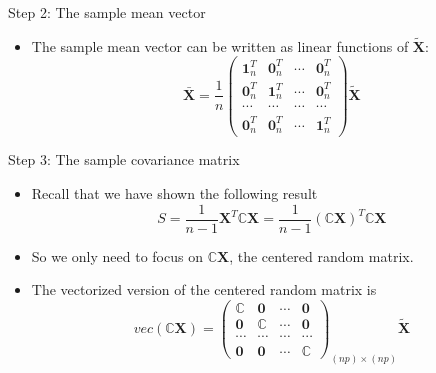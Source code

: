 \documentclass[
  ignorenonframetext,
]{beamer}
\providecommand{\tightlist}{%
  \setlength{\itemsep}{0pt}\setlength{\parskip}{0pt}}
\begin{document}
\begin{frame}{Step 2: The sample mean vector}
\protect\hypertarget{step-2-the-sample-mean-vector}{}
\begin{itemize}
\tightlist
\item
  The sample mean vector can be written as linear functions of
  \(\tilde {\mathbf X}\):
  \[\bar{\mathbf X}=\frac{1}{n} \begin{pmatrix} \mathbf 1_n^T & \mathbf 0_n^T & \cdots &\mathbf 0_n^T \\
  \mathbf 0_n^T & \mathbf 1_n^T & \cdots &\mathbf 0_n^T \\
  \cdots & \cdots & \cdots & \cdots \\
  \mathbf 0_n^T & \mathbf 0_n^T & \cdots &\mathbf 1_n^T 
  \end{pmatrix} \tilde {\mathbf X}\]
\end{itemize}
\end{frame}

\begin{frame}{Step 3: The sample covariance matrix}
\protect\hypertarget{step-3-the-sample-covariance-matrix}{}
\begin{itemize}
\tightlist
\item
  Recall that we have shown the following result
  \[S=\frac{1}{n-1} \mathbf X^T \mathbb C \mathbf X= \frac{1}{n-1} (\mathbb C \mathbf X)^T \mathbb C \mathbf X\]
\item
  So we only need to focus on \(\mathbb C \mathbf X\), the centered
  random matrix.
\item
  The vectorized version of the centered random matrix is
  \[vec(\mathbb C \mathbf X) = 
  \begin{pmatrix}
  \mathbb C & \mathbf 0 & \cdots & \mathbf 0\\
  \mathbf 0 & \mathbb C & \cdots & \mathbf 0\\
  \cdots & \cdots & \cdots & \cdots\\
  \mathbf 0 & \mathbf 0 & \cdots & \mathbb C
  \end{pmatrix}_{(np)\times (np)} \tilde {\mathbf X}
  \]
\end{itemize}
\end{frame}
\end{document}
